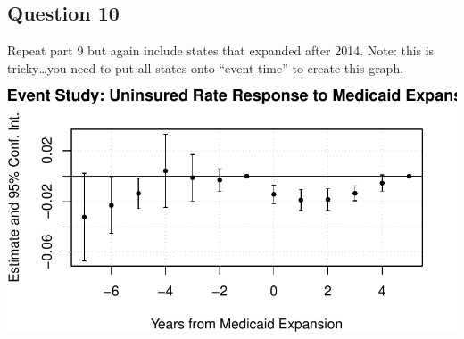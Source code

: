 \documentclass[
]{article}
\begin{document}
\subsection{Question 10}\label{question-10}

Repeat part 9 but again include states that expanded after 2014. Note:
this is tricky\ldots you need to put all states onto ``event time'' to
create this graph.

\includegraphics{ephraim-m-hwk5-1_files/figure-pdf/unnamed-chunk-8-1.pdf}
\end{document}
